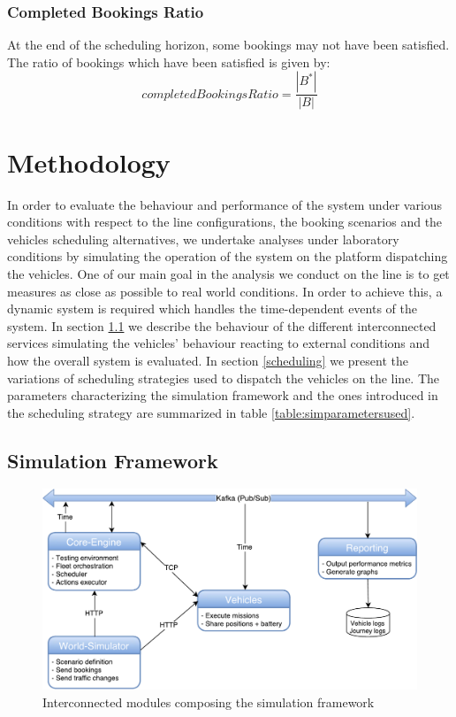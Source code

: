 \documentclass[12pt,a4paper]{article}
\begin{document}
\subsubsection*{Completed Bookings Ratio}
At the end of the scheduling horizon, some bookings may not have been satisfied. The ratio of bookings which have been satisfied is given by:
$$completedBookingsRatio = \frac{|B^{*}|}{|B|}$$

\section{Methodology}
In order to evaluate the behaviour and performance of the system under various conditions with respect to the line configurations, the booking scenarios and the vehicles scheduling alternatives, we undertake analyses under laboratory conditions by simulating the operation of the system on the platform dispatching the vehicles. One of our main goal in the analysis we conduct on the line is to get measures as close as possible to real world conditions. In order to achieve this, a dynamic system is required which handles the time-dependent events of the system. In section \ref{framework} we describe the behaviour of the different interconnected services simulating the vehicles' behaviour reacting to external conditions and how the overall system is evaluated. In section \ref{scheduling} we present the variations of scheduling strategies used to dispatch the vehicles on the line. The parameters characterizing the simulation framework and the ones introduced in the scheduling strategy are summarized in table \ref{table:simparametersused}. 

\subsection{Simulation Framework}\label{framework}
\setlength{\belowcaptionskip}{10pt}
\begin{figure}[h] 
  \centering
\includegraphics[scale=0.55]{./images/SimulationFramework2.pdf}
\caption{Interconnected modules composing the simulation framework}
\label{fig:simulationFramework}
\end{figure}
\end{document}

